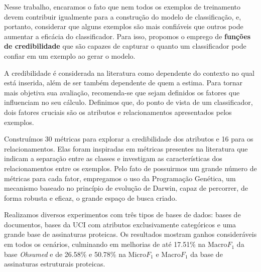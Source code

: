 Nesse trabalho, encaramos o fato que nem todos os exemplos de treinamento devem contribuir igualmente para a construção do modelo de classificação, e, portanto, considerar que alguns exemplos são mais confiáveis que outros pode aumentar a eficácia do classificador. 
Para isso, propomos o emprego de \textbf{funções de credibilidade} que são capazes de capturar o quanto um classificador pode confiar em um exemplo ao gerar o modelo.

A credibilidade é considerada na literatura como dependente do contexto no qual está inserida, além de ser também dependente de quem a estima.
Para tornar mais objetiva sua avaliação, recomenda-se que sejam definidos os fatores que influenciam no seu cálculo.
Definimos que, do ponto de vista de um classificador, dois fatores cruciais são os atributos e relacionamentos apresentados pelos exemplos.

Construímos 30 métricas para explorar a credibilidade dos atributos e 16 para os relacionamentos. Elas foram inspiradas em métricas presentes na literatura que indicam a separação entre as classes e investigam as características dos relacionamentos entre os exemplos. Pelo fato de possuirmos um grande número de métricas para cada fator, empregamos o uso da Programação Genética, um mecanismo baseado no princípio de evolução de Darwin, capaz de percorrer, de forma robusta e eficaz, o grande espaço de busca criado.

Realizamos diversos experimentos com três tipos de bases de dados: bases de documentos, bases da \textsc{UCI} com atributos exclusivamente categóricos e uma grande base de assinaturas proteicas. Os resultados mostram ganhos consideráveis em todos os cenários, culminando em melhorias de até 17.51\% na Macro$F_1$ da base \textit{Ohsumed} e de 26.58\% e 50.78\% na Micro$F_1$ e Macro$F_1$ da base de assinaturas estruturais proteicas.

